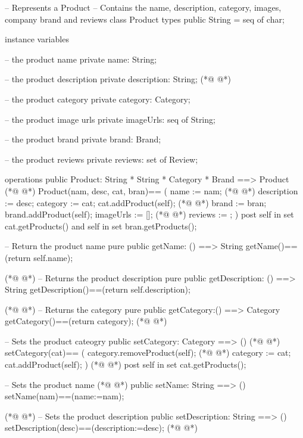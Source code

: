 \begin{vdmpp}[breaklines=true]
-- Represents a Product
-- Contains the name, description, category, images, company brand and reviews 
class Product
 types 
  public String = seq of char;
  
 instance variables
 
   -- the product name
  private name: String;
  
  -- the product description
  private description: String;
(*@
\label{Product:14}
@*)
  
  -- the product category
  private category: Category;
  
  -- the product image urls
  private imageUrls: seq of String;
  
  -- the product brand
  private brand: Brand;
  
  -- the product reviews
  private reviews: set of Review;
 
 operations
  public Product: String * String * Category * Brand ==> Product
(*@
\label{getName:29}
@*)
  Product(nam, desc, cat, bran)== 
  (
    name := nam;
(*@
\label{getDescription:32}
@*)
    description := desc;
    category := cat;
    cat.addProduct(self);
(*@
\label{getCategory:35}
@*)
    brand := bran;
    brand.addProduct(self);
    imageUrls := [];
(*@
\label{setCategory:38}
@*)
    reviews := {}; 
  )
  post self in set cat.getProducts() and 
     self in set bran.getProducts();
  
  -- Return the product name
  pure public getName: () ==> String 
  getName()==(return self.name);
  
(*@
\label{setName:47}
@*)
  -- Returns the product description
  pure public getDescription: () ==> String
  getDescription()==(return self.description);
  
(*@
\label{setDescription:51}
@*)
  -- Returns the category
  pure public getCategory:() ==> Category
  getCategory()==(return category);
(*@
\label{setImageUrls:54}
@*)
  
  -- Sets the product cateogry
  public setCategory: Category ==> ()
(*@
\label{getImageUrls:57}
@*)
  setCategory(cat)==
  (
   category.removeProduct(self);
(*@
\label{getBrand:60}
@*)
   category := cat;
   cat.addProduct(self);
  )
(*@
\label{getReviews:63}
@*)
  post self in set cat.getProducts();
  
  -- Sets the product name
(*@
\label{addReview:66}
@*)
  public setName: String ==> ()
  setName(nam)==(name:=nam);
  
(*@
\label{hasReviews:69}
@*)
  -- Sets the product description
  public setDescription: String ==> ()
  setDescription(desc)==(description:=desc);
(*@
\label{reviewAverage:72}
@*)
  

\end{vdmpp}
